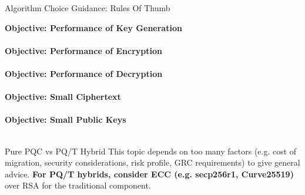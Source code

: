 \begin{minipage}[t]{0.7\textwidth}
\begin{algorithmbox}{Algorithm Choice Guidance: Rules Of Thumb}
\begin{minipage}[t]{0.5\textwidth}
            {\scriptsize \bfseries Objective: Performance of Key Generation \tbv}\\[0.1\baselineskip]
            \\[0.75\baselineskip]
            {\scriptsize \bfseries Objective: Performance of Encryption \tbv}\\[0.1\baselineskip]
            \\[0.75\baselineskip]
            {\scriptsize \bfseries Objective: Performance of Decryption \tbv}\\[0.1\baselineskip]
            \\[0.75\baselineskip]
            {\scriptsize \bfseries Objective: Small Ciphertext \tbv}\\[0.1\baselineskip]
            \\[0.75\baselineskip]
            {\scriptsize \bfseries Objective: Small Public Keys \tbv}\\[0.1\baselineskip]
            \\[0.75\baselineskip]
        \end{minipage}
    \end{algorithmbox}
    \begin{algorithmbox}{Pure PQC vs PQ/T Hybrid}
        \scriptsize
        This topic depends on too many factors (e.g. cost of migration, security considerations, risk profile, GRC requirements) to give general advice. {\bfseries For PQ/T hybrids, consider  ECC (e.g. secp256r1, Curve25519)} over RSA for the traditional component.
        \vspace{-1mm}
    \end{algorithmbox}
\end{minipage}
